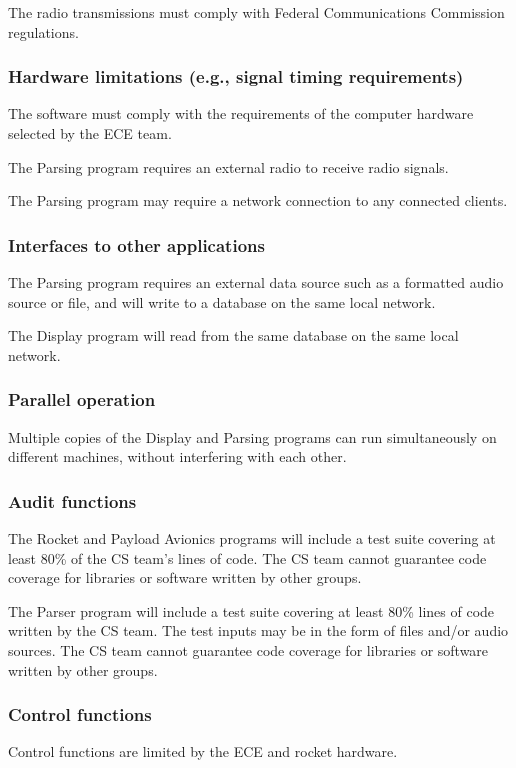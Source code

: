 \documentclass[onecolumn, draftclsnofoot, 10pt, compsoc]{IEEEtran}
\begin{document}
The radio transmissions must comply with Federal Communications Commission regulations.

\subsubsection{Hardware limitations (e.g., signal timing requirements)}
The software must comply with the requirements of the computer hardware selected by the ECE team.

The Parsing program requires an external radio to receive radio signals.

The Parsing program may require a network connection to any connected clients.

\subsubsection{Interfaces to other applications}
The Parsing program requires an external data source such as a formatted audio source or file, and will write to a database on the same local network.

The Display program will read from the same database on the same local network.

\subsubsection{Parallel operation}
Multiple copies of the Display and Parsing programs can run simultaneously on different machines, without interfering with each other.

\subsubsection{Audit functions}
The Rocket and Payload Avionics programs will include a test suite covering at least 80\% of the CS team’s lines of code.  The CS team cannot guarantee code coverage for libraries or software written by other groups.

The Parser program will include a test suite covering at least 80\% lines of code written by the CS team.  The test inputs may be in the form of files and/or audio sources.  The CS team cannot guarantee code coverage for libraries or software written by other groups.

\subsubsection{Control functions}
Control functions are limited by the ECE and rocket hardware.
\end{document}
